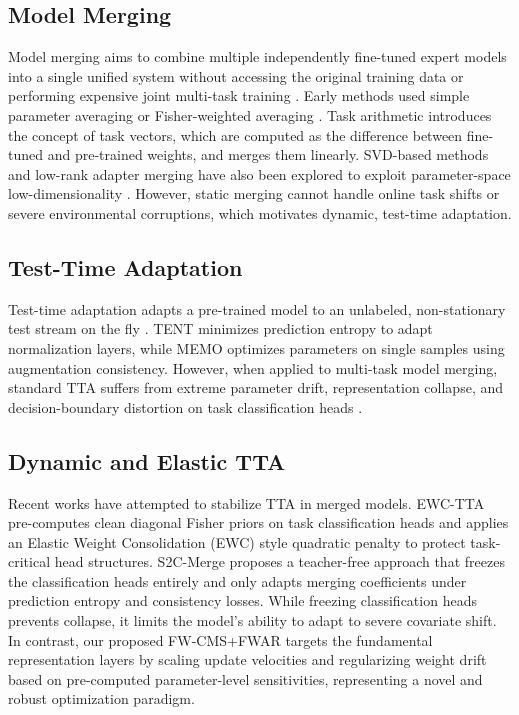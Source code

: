 \documentclass{article}
\begin{document}
\subsection{Model Merging}
Model merging aims to combine multiple independently fine-tuned expert models into a single unified system without accessing the original training data or performing expensive joint multi-task training \cite{wortsman2022model, matena2021merging, ilharco2022editing}. Early methods used simple parameter averaging \cite{wortsman2022model} or Fisher-weighted averaging \cite{matena2021merging}. Task arithmetic \cite{ilharco2022editing} introduces the concept of task vectors, which are computed as the difference between fine-tuned and pre-trained weights, and merges them linearly. SVD-based methods and low-rank adapter merging have also been explored to exploit parameter-space low-dimensionality \cite{stoica2023zipit, yu2023fusing}. However, static merging cannot handle online task shifts or severe environmental corruptions, which motivates dynamic, test-time adaptation.

\subsection{Test-Time Adaptation}
Test-time adaptation adapts a pre-trained model to an unlabeled, non-stationary test stream on the fly \cite{wang2020tent, zhang2021memo}. TENT \cite{wang2020tent} minimizes prediction entropy to adapt normalization layers, while MEMO \cite{zhang2021memo} optimizes parameters on single samples using augmentation consistency. However, when applied to multi-task model merging, standard TTA suffers from extreme parameter drift, representation collapse, and decision-boundary distortion on task classification heads \cite{li2024collaborative, yang2024adamerging}. 

\subsection{Dynamic and Elastic TTA}
Recent works have attempted to stabilize TTA in merged models. EWC-TTA \cite{daheim2023elastic} pre-computes clean diagonal Fisher priors on task classification heads and applies an Elastic Weight Consolidation (EWC) style quadratic penalty to protect task-critical head structures. S2C-Merge \cite{li2024collaborative} proposes a teacher-free approach that freezes the classification heads entirely and only adapts merging coefficients under prediction entropy and consistency losses. While freezing classification heads prevents collapse, it limits the model's ability to adapt to severe covariate shift. In contrast, our proposed FW-CMS+FWAR targets the fundamental representation layers by scaling update velocities and regularizing weight drift based on pre-computed parameter-level sensitivities, representing a novel and robust optimization paradigm.
\end{document}
